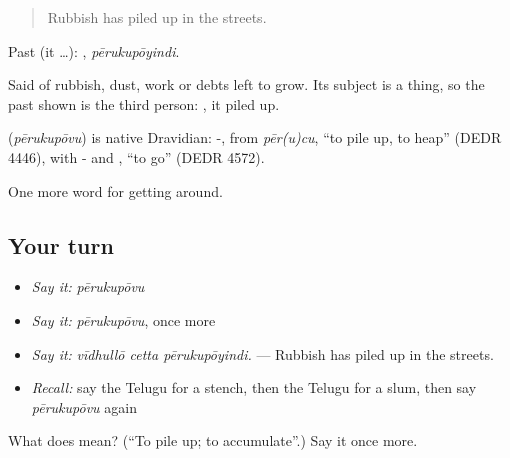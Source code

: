 \begin{quote}
Rubbish has piled up in the streets.
\end{quote}

Past (it …): , \emph{pērukupōyindi}.

Said of rubbish, dust, work or debts left to grow. Its subject is a thing, so the past shown is the third person: , it piled up.

\begin{cousinweb}
\textbf{} (\emph{pērukupōvu}) is native Dravidian: -, from \emph{pēr(u)cu}, \textquotedblleft{}to pile up, to heap\textquotedblright{} (DEDR 4446), with - and , \textquotedblleft{}to go\textquotedblright{} (DEDR 4572).
\end{cousinweb}

\begin{grammarlens}[title={What you've built}]
One more word for getting around.
\end{grammarlens}

\subsection*{Your turn}
\begin{itemize}
\raggedright
  \item \emph{Say it:} \emph{pērukupōvu}
  \item \emph{Say it:} \emph{pērukupōvu}, once more
  \item \emph{Say it:} \emph{vīdhullō cetta pērukupōyindi.} — Rubbish has piled up in the streets.
  \item \emph{Recall:} say the Telugu for a stench, then the Telugu for a slum, then say \emph{pērukupōvu} again
\end{itemize}

\begin{tcolorbox}[breakable,colback=teal!4,colframe=teal!35!black,title={Before you move on}]
What does  mean? (\textquotedblleft{}To pile up; to accumulate\textquotedblright{}.) Say it once more.
\end{tcolorbox}

